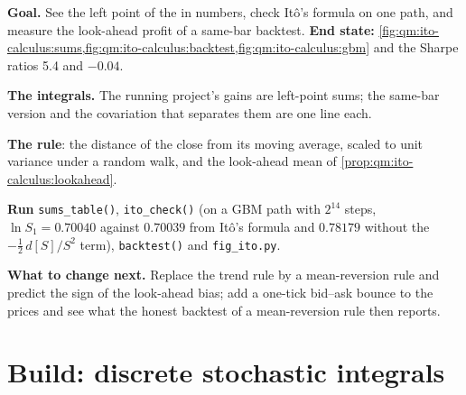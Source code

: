 \begin{tutorial}
\textbf{Goal.} See the left point of the  in numbers, check Itô's formula on one
path, and measure the look-ahead profit of a same-bar backtest. \textbf{End state:}
\cref{fig:qm:ito-calculus:sums,fig:qm:ito-calculus:backtest,fig:qm:ito-calculus:gbm} and the Sharpe
ratios 5.4 and $-0.04$.
\begin{tutsteps}
\item \textbf{The integrals.} The running project's gains are left-point sums; the same-bar
version and the covariation that separates them are one line each.
\label{lst:qm:ito-calculus:gains}
\item \textbf{The rule}: the distance of the close from its moving average, scaled to unit
variance under a random walk, and the look-ahead mean of \cref{prop:qm:ito-calculus:lookahead}.
\label{lst:qm:ito-calculus:signal}
\item \textbf{Run} \texttt{sums\_table()}, \texttt{ito\_check()} (on a GBM path with $2^{14}$ steps,
$\ln S_1 = 0.70040$ against $0.70039$ from Itô's formula and $0.78179$ without the $-\tfrac12\,d[S]/S^2$
term), \texttt{backtest()} and \texttt{fig\_ito.py}.
\end{tutsteps}
\textbf{What to change next.} Replace the trend rule by a mean-reversion rule and predict the sign
of the look-ahead bias; add a one-tick bid--ask bounce to the prices and see what the honest
backtest of a mean-reversion rule then reports.
\end{tutorial}

\section{Build: discrete stochastic integrals}\label{bld:qm:ito-calculus:stochint}

